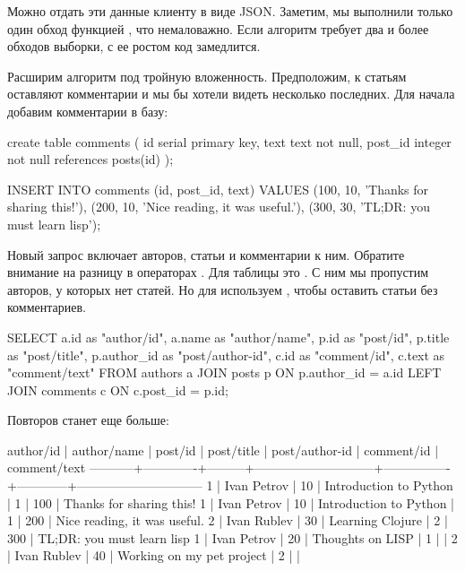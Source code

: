Можно отдать эти данные клиенту в виде JSON. Заметим, мы выполнили только один обход функцией , что немаловажно. Если алгоритм требует два и более обходов выборки, с ее ростом код замедлится.

Расширим алгоритм под тройную вложенность. Предположим, к статьям оставляют комментарии и мы бы хотели видеть несколько последних. Для начала добавим комментарии в базу:

\begin{english}
  \begin{sql}
create table comments (
  id serial primary key,
  text text not null,
  post_id integer not null references posts(id)
);

INSERT INTO comments (id, post_id, text) VALUES
  (100, 10, 'Thanks for sharing this!'),
  (200, 10, 'Nice reading, it was useful.'),
  (300, 30, 'TL;DR: you must learn lisp');
  \end{sql}
\end{english}

Новый запрос включает авторов, статьи и комментарии к ним. Обратите внимание на разницу в операторах . Для таблицы  это . С ним мы пропустим авторов, у которых нет статей. Но для  используем , чтобы оставить статьи без комментариев.

\begin{english}
  \begin{sql}
SELECT
  a.id        as "author/id",
  a.name      as "author/name",
  p.id        as "post/id",
  p.title     as "post/title",
  p.author_id as "post/author-id",
  c.id        as "comment/id",
  c.text      as "comment/text"
FROM authors a
JOIN posts p ON p.author_id = a.id
LEFT JOIN comments c ON c.post_id = p.id;
  \end{sql}
\end{english}

Повторов станет еще больше:

\begin{english}
  \begin{text}
 author/id | author/name | post/id |         post/title          | post/author-id | comment/id |         comment/text
-----------+-------------+---------+-----------------------------+----------------+------------+------------------------------
         1 | Ivan Petrov |      10 | Introduction to Python      |              1 |        100 | Thanks for sharing this!
         1 | Ivan Petrov |      10 | Introduction to Python      |              1 |        200 | Nice reading, it was useful.
         2 | Ivan Rublev |      30 | Learning Clojure            |              2 |        300 | TL;DR: you must learn lisp
         1 | Ivan Petrov |      20 | Thoughts on LISP            |              1 |            |
         2 | Ivan Rublev |      40 | Working on my pet project   |              2 |            |
  \end{text}
\end{english}

